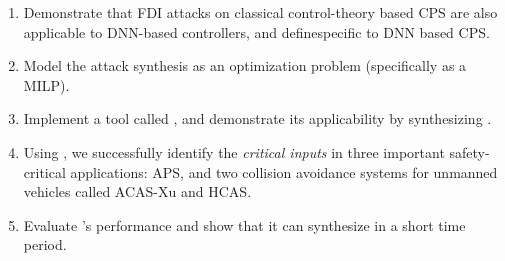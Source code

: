 \begin{enumerate}
	\item Demonstrate that FDI attacks on classical control-theory based CPS are also applicable to DNN-based controllers, and define\attack specific to DNN based CPS. %
	\item Model the attack synthesis as an optimization problem (specifically as a MILP). %
	
	\item Implement a tool called \tool, and demonstrate its applicability by synthesizing \attack.%
	\item Using \tool, we successfully identify the \textit{critical inputs} in three important safety-critical applications: \ac{APS},  and  two collision avoidance systems for unmanned vehicles called \ac{ACAS-Xu} and \ac{HCAS}.
	\item Evaluate \tool's performance and show that it can synthesize \attack in a short time period.   %
\end{enumerate}


